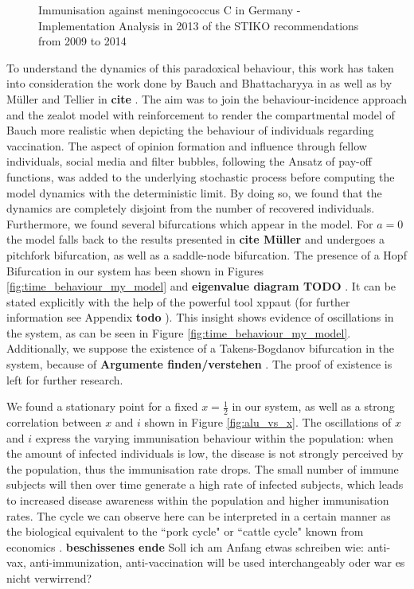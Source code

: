 \documentclass[12pt,a4paper,twoside]{article}
\begin{document}
\begin{figure}[h!]
	\centering
	\caption{Immunisation against meningococcus C in Germany - Implementation Analysis in 2013 of the \ac{STIKO} recommendations from 2009 to 2014 \cite{LamegoGreinerMGoffrierB2016}}
	\label{fig:impfkarte_meningokokken}
	\def\svgwidth{350pt}
	
\end{figure}

To understand the dynamics of this paradoxical behaviour, this work has taken into consideration the work done by Bauch and Bhattacharyya in \cite{Bauch2012} as well as by M\"uller and Tellier in \textbf{cite}%
. The aim was to join the behaviour-incidence approach and the zealot model with reinforcement to render the compartmental model of Bauch more realistic when depicting the behaviour of individuals regarding vaccination. The aspect of opinion formation and influence through fellow individuals, social media and filter bubbles, following the Ansatz of pay-off functions, was added to the underlying stochastic process before computing the model dynamics with the deterministic limit. By doing so, we found that the dynamics are completely disjoint from the number of recovered individuals. Furthermore, we found several bifurcations which appear in the model. For $a=0$ the model falls back to the results presented in \textbf{cite Müller}%
and undergoes a pitchfork bifurcation, as well as a saddle-node bifurcation. The presence of a Hopf Bifurcation in our system has been shown in Figures \ref{fig:time_behaviour_my_model} and \textbf{eigenvalue diagram TODO}%
 . It can be stated explicitly with the help of the powerful tool xppaut (for further information see Appendix \textbf{todo}%
 ). This insight shows evidence of oscillations in the system, as can be seen in Figure \eqref{fig:time_behaviour_my_model}. Additionally, we suppose the existence of a Takens-Bogdanov bifurcation in the system, because of \textbf{Argumente finden/verstehen}%
 . The proof of existence is left for further research. \newline
 
 We found a stationary point for a fixed $x = \frac{1}{2}$ in our system, as well as a strong correlation between $x$ and $i$ shown in Figure \ref{fig:alu_vs_x}. The oscillations of $x$ and $i$ express the varying immunisation behaviour within the population: when the amount of infected individuals is low, the disease is not strongly perceived by the population, thus the immunisation rate drops. The small number of immune subjects will then over time generate a high rate of infected subjects, which leads to increased disease awareness within the population and higher immunisation rates. The cycle we can observe here can be interpreted in a certain manner as the biological equivalent to the ``pork cycle" or ``cattle cycle" known from economics \cite{Rosen1994}. \textbf{beschissenes ende}\newline\newline
 Soll ich am Anfang etwas schreiben wie: anti-vax, anti-immunization, anti-vaccination will be used interchangeably oder war es nicht verwirrend?

\newpage

\printbibliography

%
\end{document}
